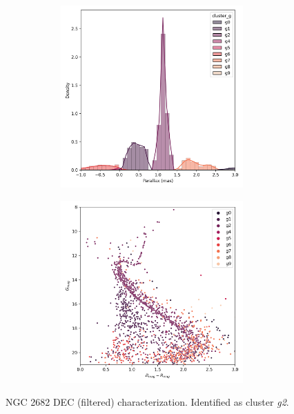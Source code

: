 \documentclass[11pt, a4paper, english]{book}
\begin{document}
\begin{figure}[H]
\begin{subfigure}{0.9\textwidth}
\begin{subfigure}[t]{0.30\textwidth}
    \end{subfigure}
    \hfill
    \begin{subfigure}[t]{0.30\textwidth}
      \centering
      \includegraphics[width=\textwidth]{../figures/ngc_2682/dec_parallax_filtered_ngc_2682.png}
    \end{subfigure}
    \hfill
    \begin{subfigure}[t]{0.30\textwidth}
      \centering
      \includegraphics[width=\textwidth]{../figures/ngc_2682/dec_hr_diagram_filtered_ngc_2682.png}
    \end{subfigure}
  \end{subfigure}
  \caption{NGC 2682 DEC (filtered) characterization. Identified as cluster \emph{g2}.}
  \label{fig:result_ngc_2682_dec_filtered}
\end{figure}
\end{document}
